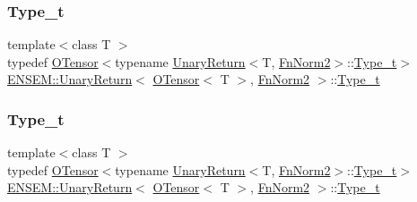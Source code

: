 \subsubsection{\texorpdfstring{Type\_t}{Type\_t}\hspace{0.1cm}{\footnotesize\ttfamily [1/3]}}
{\footnotesize\ttfamily template$<$class T $>$ \\
typedef \mbox{\hyperlink{classENSEM_1_1OTensor}{O\+Tensor}}$<$typename \mbox{\hyperlink{structENSEM_1_1UnaryReturn}{Unary\+Return}}$<$T, \mbox{\hyperlink{structENSEM_1_1FnNorm2}{Fn\+Norm2}}$>$\+::\mbox{\hyperlink{structENSEM_1_1UnaryReturn_3_01OTensor_3_01T_01_4_00_01FnNorm2_01_4_a61af55ec610c7d6312c97907937f00bd}{Type\+\_\+t}}$>$ \mbox{\hyperlink{structENSEM_1_1UnaryReturn}{E\+N\+S\+E\+M\+::\+Unary\+Return}}$<$ \mbox{\hyperlink{classENSEM_1_1OTensor}{O\+Tensor}}$<$ T $>$, \mbox{\hyperlink{structENSEM_1_1FnNorm2}{Fn\+Norm2}} $>$\+::\mbox{\hyperlink{structENSEM_1_1UnaryReturn_3_01OTensor_3_01T_01_4_00_01FnNorm2_01_4_a61af55ec610c7d6312c97907937f00bd}{Type\+\_\+t}}}

\mbox{\label{structENSEM_1_1UnaryReturn_3_01OTensor_3_01T_01_4_00_01FnNorm2_01_4_a61af55ec610c7d6312c97907937f00bd}} 
\subsubsection{\texorpdfstring{Type\_t}{Type\_t}\hspace{0.1cm}{\footnotesize\ttfamily [2/3]}}
{\footnotesize\ttfamily template$<$class T $>$ \\
typedef \mbox{\hyperlink{classENSEM_1_1OTensor}{O\+Tensor}}$<$typename \mbox{\hyperlink{structENSEM_1_1UnaryReturn}{Unary\+Return}}$<$T, \mbox{\hyperlink{structENSEM_1_1FnNorm2}{Fn\+Norm2}}$>$\+::\mbox{\hyperlink{structENSEM_1_1UnaryReturn_3_01OTensor_3_01T_01_4_00_01FnNorm2_01_4_a61af55ec610c7d6312c97907937f00bd}{Type\+\_\+t}}$>$ \mbox{\hyperlink{structENSEM_1_1UnaryReturn}{E\+N\+S\+E\+M\+::\+Unary\+Return}}$<$ \mbox{\hyperlink{classENSEM_1_1OTensor}{O\+Tensor}}$<$ T $>$, \mbox{\hyperlink{structENSEM_1_1FnNorm2}{Fn\+Norm2}} $>$\+::\mbox{\hyperlink{structENSEM_1_1UnaryReturn_3_01OTensor_3_01T_01_4_00_01FnNorm2_01_4_a61af55ec610c7d6312c97907937f00bd}{Type\+\_\+t}}}

